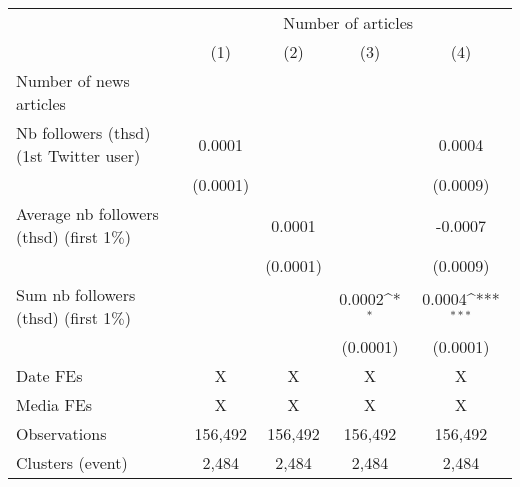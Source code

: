 {
\def\sym#1{\ifmmode^{#1}\else\(^{#1}\)\fi}
\begin{tabular}{l*{4}{c}}
\hline\hline
                    &\multicolumn{4}{c}{Number of articles}                                                 \\\cmidrule(lr){2-5}
                    &\multicolumn{1}{c}{(1)}         &\multicolumn{1}{c}{(2)}         &\multicolumn{1}{c}{(3)}         &\multicolumn{1}{c}{(4)}         \\
\hline
Number of news articles&                     &                     &                     &                     \\
Nb followers (thsd) (1st Twitter user)&      0.0001         &                     &                     &      0.0004         \\
                    &    (0.0001)         &                     &                     &    (0.0009)         \\
Average nb followers (thsd) (first 1$\%$)&                     &      0.0001         &                     &     -0.0007         \\
                    &                     &    (0.0001)         &                     &    (0.0009)         \\
Sum nb followers (thsd) (first 1$\%$)&                     &                     &      0.0002\sym{*}  &      0.0004\sym{***}\\
                    &                     &                     &    (0.0001)         &    (0.0001)         \\
\hline
Date FEs            &           X         &           X         &           X         &           X         \\
Media FEs           &           X         &           X         &           X         &           X         \\
Observations        &     156,492         &     156,492         &     156,492         &     156,492         \\
Clusters (event)    &       2,484         &       2,484         &       2,484         &       2,484         \\
\hline\hline
\end{tabular}
}
